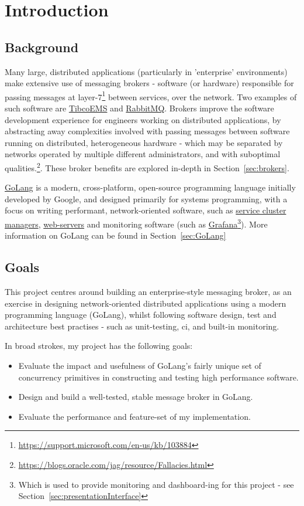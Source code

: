 \chapter{Introduction}
\label{chap:Introduction}

\section{Background}
\label{sec:background}

Many large, distributed applications (particularly in 'enterprise' environments)
make extensive use of messaging brokers - software (or
hardware\cite{solaceappliances}) responsible for passing messages at
layer-7\footnote{\url{https://support.microsoft.com/en-us/kb/103884}} between
services, over the network. Two examples of such software are
\href{http://www.tibco.com/products/automation/enterprise-messaging/enterprise-message-service}{TibcoEMS}
and \href{https://www.rabbitmq.com/}{RabbitMQ}. Brokers improve the software
development experience for engineers working on distributed applications, by
abstracting away complexities involved with passing messages between software
running on distributed, heterogeneous hardware - which may be separated by
networks operated by multiple different administrators, and with suboptimal
qualities.\footnote{\url{https://blogs.oracle.com/jag/resource/Fallacies.html}}.
These broker benefits are explored in-depth in Section~\ref{sec:brokers}.

\href{https://golang.org/}{GoLang} is a modern, cross-platform, open-source
programming language initially developed by Google, and designed primarily for
systems programming, with a focus on writing performant, network-oriented
software, such as \href{https://github.com/kubernetes/kubernetes}{service
cluster managers}, \href{https://github.com/mholt/caddy}{web-servers} and
monitoring software (such as
\href{https://github.com/grafana/grafana}{Grafana}\footnote{Which is used to
provide monitoring and dashboard-ing for this project - see
Section~\ref{sec:presentationInterface}}). More information on GoLang can be
found in Section~\ref{sec:GoLang}

\section{Goals}
This project centres around building an enterprise-style messaging broker, as an
exercise in designing network-oriented distributed applications using a modern
programming language (GoLang), whilst following software design, test and
architecture best practises - such as unit-testing, \gls{ci}, and
built-in monitoring.

In broad strokes, my project has the following goals:

 \begin{itemize}
   \item Evaluate the impact and usefulness of GoLang's fairly unique set of
   concurrency primitives in constructing and testing high performance software.
   \item Design and build a well-tested, stable message broker in GoLang.
   \item Evaluate the performance and feature-set of my implementation.
 \end{itemize}
